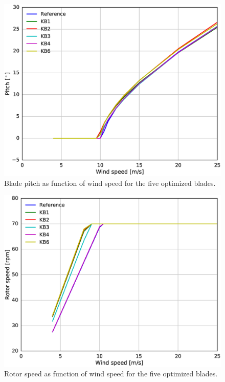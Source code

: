 \begin{figure}[!ht]
\begin{center}
	\includegraphics[width=.85\linewidth]{figures/KBcomp_pitch.eps}
\end{center}
\caption{Blade pitch as function of wind speed for the five optimized blades.}
\label{fig:pitch}
\end{figure}

\begin{figure}[!ht]
\begin{center}
	\includegraphics[width=.85\linewidth]{figures/KBcomp_rpm.eps}
\end{center}
\caption{Rotor speed as function of wind speed for the five optimized blades.}
\label{fig:rpm}
\end{figure}

\clearpage

